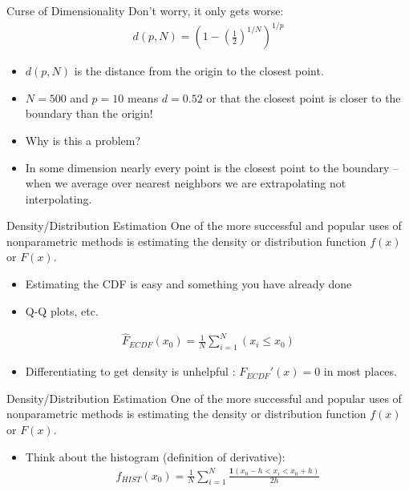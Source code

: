 \begin{frame}{Curse of Dimensionality}
Don't worry, it only gets worse:
\begin{eqnarray*}
d(p,N) = \left(1-\left(\frac{1}{2} \right)^{1/N} \right)^{1/p}
\end{eqnarray*}

\begin{itemize}
\item $d(p,N)$ is the distance from the origin to the closest point.
\item $N=500$ and $p=10$ means $d = 0.52$ or that the closest point is closer to the boundary than the origin!
\item Why is this a problem?
\item In some dimension nearly every point is the closest point to the boundary -- when we average over nearest neighbors we are \alert{extrapolating} not \alert{interpolating}.
\end{itemize}
\end{frame}


\begin{frame}{Density/Distribution Estimation}
One of the more successful and popular uses of nonparametric methods is estimating the density or distribution function $f(x)$ or $F(x)$.
\begin{itemize}
\item Estimating the CDF is easy and something you have already done
\item Q-Q plots, etc.
\end{itemize}
\begin{eqnarray*}
\hat{F}_{ECDF}(x_0) = \frac{1}{N} \sum_{i=1}^N (x_i \leq x_0 )
\end{eqnarray*}
\begin{itemize}
\item Differentiating to get density is unhelpful : $F_{ECDF}'(x) = 0$ in most places.
\end{itemize}
\end{frame}

\begin{frame}{Density/Distribution Estimation}
One of the more successful and popular uses of nonparametric methods is estimating the density or distribution function $f(x)$ or $F(x)$.
\begin{itemize}
\item Think about the histogram (definition of derivative):
\begin{eqnarray*}
\hat{f}_{HIST}(x_0) = \frac{1}{N} \sum_{i=1}^N \frac{\mathbf{1}(x_0 - h < x_i < x_0 + h)}{2 h}
\end{eqnarray*}
\end{itemize}
\end{frame}

